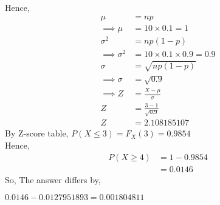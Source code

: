\documentclass[journal,12pt,twocolumn]{IEEEtran}
\theoremstyle{remark}
\begin{document}
Hence,
\begin{align} 
	\mu &= np\\
\implies
	\mu &= 10 \times 0.1 = 1\\
	\sigma^{2}&= np(1-p)\\
\implies	
	\sigma^{2}&= 10 \times 0.1 \times 0.9 = 0.9\\
	\sigma&=\sqrt{np(1-p)}\\
\implies
	\sigma&= \sqrt{0.9}\\
\implies
	Z &= \frac{X-\mu}{\sigma}\\
	Z &= \frac{3-1}{\sqrt{0.9}}\\
	Z &= 2.108185107
\end{align}
By Z-score table,
\(P(X \leq 3) = F_X(3) = 0.9854\)\\
Hence,
\begin{align}
P(X \geq 4) &= 1 - 0.9854\\
	  &= 0.0146
\end{align}
So, The answer differs by,

\(0.0146 - 0.0127951893 = 0.001804811\)
\end{document}
